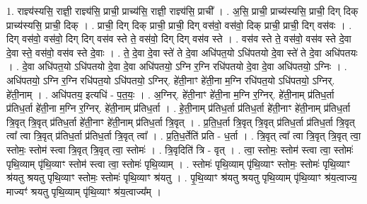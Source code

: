 \documentclass[17pt]{extarticle}
\begin{document}
1. राज्ञ्य॑स्यसि॒ राज्ञी॒ राज्ञ्य॑सि॒ प्राची॒ प्राच्य॑सि॒ राज्ञी॒ राज्ञ्य॑सि॒ प्राची᳚ । . अ॒सि॒ प्राची॒ प्राच्य॑स्यसि॒ प्राची॒ दिग् दिक् प्राच्य॑स्यसि॒ प्राची॒ दिक् । . प्राची॒ दिग् दिक् प्राची॒ प्राची॒ दिग् वस॑वो॒ वस॑वो॒ दिक् प्राची॒ प्राची॒ दिग् वस॑वः । . दिग् वस॑वो॒ वस॑वो॒ दिग् दिग् वस॑व स्ते ते॒ वस॑वो॒ दिग् दिग् वस॑व स्ते । . वस॑व स्ते ते॒ वस॑वो॒ वस॑व स्ते दे॒वा दे॒वा स्ते॒ वस॑वो॒ वस॑व स्ते दे॒वाः । . ते॒ दे॒वा दे॒वा स्ते॑ ते दे॒वा अधि॑पत॒यो ऽधि॑पतयो दे॒वा स्ते॑ ते दे॒वा अधि॑पतयः । . दे॒वा अधि॑पत॒यो ऽधि॑पतयो दे॒वा दे॒वा अधि॑पतयो॒ ऽग्नि र॒ग्नि रधि॑पतयो दे॒वा दे॒वा अधि॑पतयो॒ ऽग्निः । . अधि॑पतयो॒ ऽग्नि र॒ग्नि रधि॑पत॒यो ऽधि॑पतयो॒ ऽग्निर्. हे॑ती॒नाꣳ हे॑ती॒ना म॒ग्नि रधि॑पत॒यो ऽधि॑पतयो॒ ऽग्निर्. हे॑ती॒नाम् । . अधि॑पतय॒ इत्यधि॑ - प॒त॒यः॒ । . अ॒ग्निर्. हे॑ती॒नाꣳ हे॑ती॒ना म॒ग्नि र॒ग्निर्. हे॑ती॒नाम् प्र॑तिध॒र्ता प्र॑तिध॒र्ता हे॑ती॒ना म॒ग्नि र॒ग्निर्. हे॑ती॒नाम् प्र॑तिध॒र्ता । . हे॒ती॒नाम् प्र॑तिध॒र्ता प्र॑तिध॒र्ता हे॑ती॒नाꣳ हे॑ती॒नाम् प्र॑तिध॒र्ता त्रि॒वृत् त्रि॒वृत् प्र॑तिध॒र्ता हे॑ती॒नाꣳ हे॑ती॒नाम् प्र॑तिध॒र्ता त्रि॒वृत् । . प्र॒ति॒ध॒र्ता त्रि॒वृत् त्रि॒वृत् प्र॑तिध॒र्ता प्र॑तिध॒र्ता त्रि॒वृत् त्वा᳚ त्वा त्रि॒वृत् प्र॑तिध॒र्ता प्र॑तिध॒र्ता त्रि॒वृत् त्वा᳚ । . प्र॒ति॒ध॒र्तेति॑ प्रति - ध॒र्ता । . त्रि॒वृत् त्वा᳚ त्वा त्रि॒वृत् त्रि॒वृत् त्वा॒ स्तोमः॒ स्तोम॑ स्त्वा त्रि॒वृत् त्रि॒वृत् त्वा॒ स्तोमः॑ । . त्रि॒वृदिति॑ त्रि - वृत् । . त्वा॒ स्तोमः॒ स्तोम॑ स्त्वा त्वा॒ स्तोमः॑ पृथि॒व्याम् पृ॑थि॒व्याꣳ स्तोम॑ स्त्वा त्वा॒ स्तोमः॑ पृथि॒व्याम् । . स्तोमः॑ पृथि॒व्याम् पृ॑थि॒व्याꣳ स्तोमः॒ स्तोमः॑ पृथि॒व्याꣳ श्र॑यतु श्रयतु पृथि॒व्याꣳ स्तोमः॒ स्तोमः॑ पृथि॒व्याꣳ श्र॑यतु । . पृ॒थि॒व्याꣳ श्र॑यतु श्रयतु पृथि॒व्याम् पृ॑थि॒व्याꣳ श्र॑य॒त्वाज्य॒ माज्यꣳ॑ श्रयतु पृथि॒व्याम् पृ॑थि॒व्याꣳ श्र॑य॒त्वाज्य᳚म् । \newline
\end{document}
